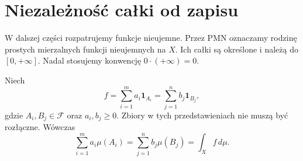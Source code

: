 
\section{Niezależność całki od zapisu}
\label{sec:niezaleznosc-calki-od-zapisu}

W dalszej części rozpatrujemy funkcje nieujemne. Przez
$\mathrm{PMN}$ oznaczamy rodzinę prostych mierzalnych funkcji
nieujemnych na $X$. Ich całki są określone i należą do $[0,+\infty]$.
Nadal stosujemy konwencję $0\cdot(+\infty)=0$.

\begin{twierdzenie}
\label{tw:calka-niezalezna-od-przedstawienia}
Niech
\[
  f=\sum_{i=1}^{m}a_i\mathbf{1}_{A_i}
   =\sum_{j=1}^{n}b_j\mathbf{1}_{B_j},
\]
gdzie $A_i,B_j\in\mathcal{F}$ oraz $a_i,b_j\geq0$.
Zbiory w tych przedstawieniach nie muszą być rozłączne.
Wówczas
\begin{equation}
  \sum_{i=1}^{m}a_i\mu(A_i)
  =\sum_{j=1}^{n}b_j\mu(B_j)
  =\int_X f\,d\mu.
  \label{eq:calka-dowolny-zapis-prostej}
\end{equation}
\end{twierdzenie}

